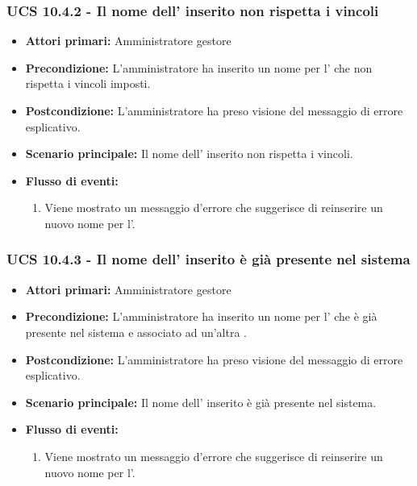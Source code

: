 \subsubsection{UCS 10.4.2 - Il nome dell' inserito non rispetta i vincoli}%
\begin{itemize}
\item \textbf{Attori primari:} Amministratore gestore
\item \textbf{Precondizione:} L'amministratore ha inserito un nome per l' che non rispetta i vincoli imposti.
\item \textbf{Postcondizione:} L'amministratore ha preso visione del messaggio di errore esplicativo.
\item \textbf{Scenario principale:} Il nome dell' inserito non rispetta i vincoli.
\item \textbf{Flusso di eventi:}
    \begin{enumerate}
    \item Viene mostrato un messaggio d'errore che suggerisce di reinserire un nuovo nome per l'.
    \end{enumerate} 
\end{itemize}

\subsubsection{UCS 10.4.3 - Il nome dell' inserito è già presente nel sistema}%
\begin{itemize}
\item \textbf{Attori primari:} Amministratore gestore
\item \textbf{Precondizione:} L'amministratore ha inserito un nome per l' che è già presente nel sistema e associato ad un'altra .
\item \textbf{Postcondizione:} L'amministratore ha preso visione del messaggio di errore esplicativo.
\item \textbf{Scenario principale:} Il nome dell' inserito è già presente nel sistema.
\item \textbf{Flusso di eventi:}
    \begin{enumerate}
    \item Viene mostrato un messaggio d'errore che suggerisce di reinserire un nuovo nome per l'.
    \end{enumerate} 
\end{itemize}

